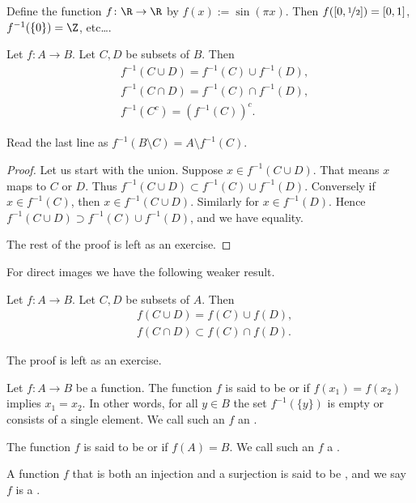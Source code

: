 \documentclass[12pt]{book}
\begin{document}
\begin{example}
Define the function $f \colon \R \to \R$ by
$f(x) := \sin(\pi x)$.
Then $f([0,\nicefrac{1}{2}]) = [0,1]$, 
$f^{-1}(\{0\}) = \Z$, etc\ldots.
\end{example}

\begin{prop} \label{st:propinv}
Let $f \colon A \to B$.
Let $C, D$ be subsets of $B$.
Then
\begin{align*}
& f^{-1}( C \cup D) = f^{-1} (C) \cup f^{-1} (D) , \\
& f^{-1}( C \cap D) = f^{-1} (C) \cap f^{-1} (D) , \\
& f^{-1}( C^c) = {\left( f^{-1} (C) \right)}^c .
\end{align*}
\end{prop}

Read the last line as
$f^{-1}( B \setminus C) = A \setminus f^{-1} (C)$.

\begin{proof}
Let us start with the union.
Suppose $x \in 
f^{-1}( C \cup D)$.
That means 
$x$ maps to $C$ or $D$.
Thus
$f^{-1}( C \cup D) \subset f^{-1} (C) \cup f^{-1} (D)$.
Conversely
if $x \in f^{-1}(C)$, then $x \in f^{-1}(C \cup D)$.
Similarly for
$x \in f^{-1}(D)$.
Hence
$f^{-1}( C \cup D) \supset f^{-1} (C) \cup f^{-1} (D)$, and we have
equality.

The rest of the proof is left as an exercise.
\end{proof}

For direct images we have the following weaker result.

\begin{prop} \label{st:propfor}
Let $f \colon A \to B$.
Let $C, D$ be subsets of $A$.
Then
\begin{align*}
& f( C \cup D) = f (C) \cup f (D) , \\
& f( C \cap D) \subset f (C) \cap f (D) .
\end{align*}
\end{prop}

The proof is left as an exercise.

\begin{defn}
Let $f \colon A \to B$ be a function.
The function $f$ is said to be
\emph{} or
\emph{} if $f(x_1) = f(x_2)$ implies $x_1 = x_2$.
In
other words,
for all $y \in B$ the set
$f^{-1}(\{y\})$ is empty or consists of a single element.
We call such an $f$ an \emph{}.

The function $f$ is said to be
\emph{} or
\emph{} if $f(A) = B$.
We call such an $f$ a \emph{}.

A function $f$ that is both an injection and a surjection is
said to be \emph{}, and we say $f$ is a
\emph{}.
\end{defn}
\end{document}
